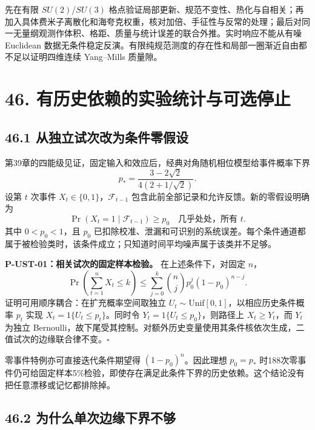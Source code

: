 \documentclass[
  11pt,
  oneside]{book}
\begin{document}
先在有限 \(SU(2)\)/\(SU(3)\)
格点验证局部更新、规范不变性、热化与自相关；再加入具体费米子离散化和海夸克权重，核对加倍、手征性与反常的处理；最后对同一无量纲观测作体积、格距、质量与统计误差的联合外推。实时响应不能从有噪
Euclidean
数据无条件稳定反演。有限纯规范测度的存在性和局部一圈渐近自由都不足以证明四维连续
Yang--Mills 质量隙。

\hypertarget{ch-46}{%
\chapter{46. 有历史依赖的实验统计与可选停止}\label{ch-46}}

\hypertarget{ux4eceux72ecux7acbux8bd5ux6b21ux6539ux4e3aux6761ux4ef6ux96f6ux5047ux8bbe}{%
\section{46.1
从独立试次改为条件零假设}\label{ux4eceux72ecux7acbux8bd5ux6b21ux6539ux4e3aux6761ux4ef6ux96f6ux5047ux8bbe}}

第39章的四能级见证，固定输入和效应后，经典对角随机相位模型给事件概率下界
\[
p_* =\frac{3-2\sqrt2}{4(2+1/\sqrt2)}.
\] 设第 \(t\) 次事件 \(X_t\in\{0,1\}\)，\(\mathcal F_{t-1}\)
包含此前全部记录和允许反馈。新的零假设明确为 \[
\Pr(X_t=1\mid\mathcal F_{t-1})\ge p_0\quad\text{几乎处处，所有 }t.
\] 其中 \(0<p_0<1\)，且 \(p_0\)
已扣除校准、泄漏和可识别的系统误差。每个条件通道都属于被检验类时，该条件成立；只知道时间平均噪声属于该类并不足够。

\protect\hypertarget{p-ust-01}{}{}

\textbf{P-UST-01：相关试次的固定样本检验。} 在上述条件下，对固定 \(n\)，
\[
\Pr\left(\sum_{t=1}^nX_t\le k\right)
\le\sum_{j=0}^k{n\choose j}p_0^j(1-p_0)^{n-j}.
\] 证明可用顺序耦合：在扩充概率空间取独立
\(U_t\sim\mathrm{Unif}[0,1]\)，以相应历史条件概率 \(p_t\) 实现
\(X_t=1\{U_t\le p_t\}\)。同时令 \(Y_t=1\{U_t\le p_0\}\)，则路径上
\(X_t\ge Y_t\)，而 \(Y_t\) 为独立
Bernoulli，故下尾受其控制。对额外历史变量使用其条件核依次生成，二值试次的边缘联合律不变。\(\square\)

零事件特例亦可直接迭代条件期望得 \((1-p_0)^n\)。因此理想 \(p_0=p_*\)
时188次零事件仍可给固定样本5\%检验，即使存在满足此条件下界的历史依赖。这个结论没有把任意漂移或记忆都排除掉。

\hypertarget{ux4e3aux4ec0ux4e48ux5355ux6b21ux8fb9ux7f18ux4e0bux754cux4e0dux591f}{%
\section{46.2
为什么单次边缘下界不够}\label{ux4e3aux4ec0ux4e48ux5355ux6b21ux8fb9ux7f18ux4e0bux754cux4e0dux591f}}
\end{document}
